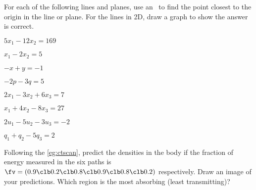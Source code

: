
\begin{exercise}  
For each of the following lines and planes,
use an \svd\ to find the point closest to the origin in the line or plane.
For the lines in 2D, draw a graph to show the answer is correct.
\begin{Parts}
\item \(5x_1-12x_2=169\)

\item \(x_1-2x_2=5\)

\begin{reduce}
\item \(-x+y=-1\)

\item \(-2p-3q=5\)
\end{reduce}

\item \(2x_1-3x_2+6x_3=7\)

\begin{reduce}
\item \(x_1+4x_2-8x_3=27\)

\item \(2u_1-5u_2-3u_3=-2\)
\end{reduce}

\item \(q_1+q_2-5q_3=2\)

\end{Parts}
\end{exercise}



\begin{exercise}  
Following the  \cref{eg:ctscan}, predict the densities in the body if the fraction of  energy measured in the six paths is \(\fv=(0.9\clb 0.2\clb 0.8\clb 0.9\clb 0.8\clb 0.2)\) respectively.  
Draw an image of your predictions.  Which region is the most absorbing (least transmitting)?
\end{exercise}



